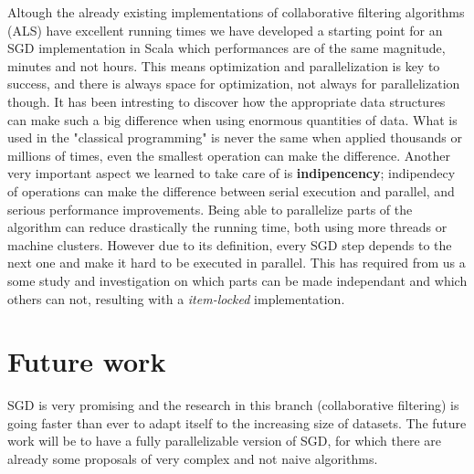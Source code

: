 \documentclass{sig-alternate-05-2015}
\begin{document}
Altough the already existing implementations of collaborative
filtering algorithms (ALS) have excellent running times we
have developed a starting point for an SGD implementation in Scala
which performances are of the same magnitude, minutes and not hours.
This means optimization and parallelization is key to success, and
there is always space for optimization, not always for parallelization though.
It has been intresting to discover how the appropriate data structures can make
such a big difference when using enormous quantities of data. What is
used in the "classical programming" is never the same when applied thousands
or millions of times, even the smallest operation can make the difference.
Another very important aspect we learned to take care of is \textbf{indipencency};
indipendecy of operations can make the difference between serial execution and parallel,
and serious performance improvements. Being able to parallelize parts of the algorithm
can reduce drastically the running time, both using more threads or machine clusters.
However due to its definition, every SGD step depends to the next one and make it hard
to be executed in parallel. This has required from us a some study and investigation
on which parts can be made independant and which others can not, resulting with
a \textit{item-locked} implementation.

\section{Future work}

SGD is very promising and the research in this branch (collaborative filtering)
is going faster than ever to adapt itself to the increasing size of datasets.
The future work will be to have a fully parallelizable version of SGD, for which
there are already some proposals of very complex and not naive algorithms.

%

%
%
\appendix
\end{document}
